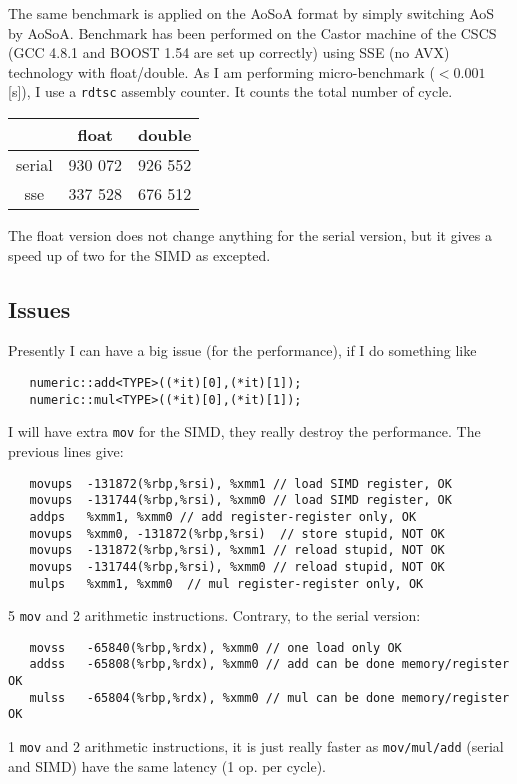 \documentclass[11pt]{amsart}
\begin{document}
The same benchmark is applied on the AoSoA format by simply switching AoS by AoSoA. Benchmark has been performed on the Castor machine of the CSCS (GCC 4.8.1 and BOOST 1.54 are set up correctly) using SSE (no AVX) technology with float/double. As I am performing micro-benchmark ($< 0.001$ [s]), I use a \verb+rdtsc+ assembly counter. It counts the total number of cycle.
\begin{center}
\begin{tabular}{c c c }
           &  float & double \\
           \hline
serial &  930 072  & 926 552  \\
sse     &  337 528  & 676 512 \\
\end{tabular}
\end{center}

The float version does not change anything for the serial version, but it gives a speed up of two for the SIMD as excepted.

\subsection*{Issues}

Presently I can have a big issue (for the performance), if I do something like 

\begin{lstlisting}
   numeric::add<TYPE>((*it)[0],(*it)[1]);
   numeric::mul<TYPE>((*it)[0],(*it)[1]);
\end{lstlisting}
\vspace{0.2cm}
I will have extra \verb+mov+ for the SIMD, they really destroy the performance. The previous lines give:
\vspace{0.2cm}
\begin{lstlisting}
   movups  -131872(%rbp,%rsi), %xmm1 // load SIMD register, OK
   movups  -131744(%rbp,%rsi), %xmm0 // load SIMD register, OK
   addps   %xmm1, %xmm0 // add register-register only, OK
   movups  %xmm0, -131872(%rbp,%rsi)  // store stupid, NOT OK
   movups  -131872(%rbp,%rsi), %xmm1 // reload stupid, NOT OK
   movups  -131744(%rbp,%rsi), %xmm0 // reload stupid, NOT OK
   mulps   %xmm1, %xmm0  // mul register-register only, OK 
\end{lstlisting}
\vspace{0.2cm}
5  \verb+mov+   and 2 arithmetic instructions. Contrary, to the serial version:
\vspace{0.2cm}
\begin{lstlisting}
   movss   -65840(%rbp,%rdx), %xmm0 // one load only OK
   addss   -65808(%rbp,%rdx), %xmm0 // add can be done memory/register OK
   mulss   -65804(%rbp,%rdx), %xmm0 // mul can be done memory/register OK
\end{lstlisting}
\vspace{0.2cm}
1  \verb+mov+   and 2 arithmetic instructions, it is just really faster as \verb+mov/mul/add+  (serial and SIMD) have the same latency (1 op. per cycle).
\end{document}
